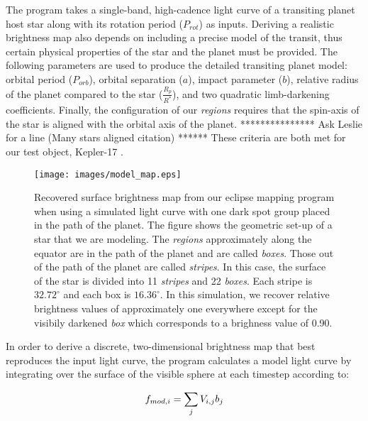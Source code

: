 The program takes a single-band, high-cadence light curve of a transiting planet host star along with its rotation period ($P_{rot}$) as inputs. Deriving a realistic brightness map also depends on including a precise model of the transit, thus certain physical properties of the star and the planet must be provided. The following parameters are used to produce the detailed transiting planet model: orbital period ($P_{orb}$), orbital separation ($a$), impact parameter ($b$), relative radius of the planet compared to the star ($\frac{R_p}{R^{*}}$), and two quadratic limb-darkening coefficients. Finally, the configuration of our {\it regions} requires that the spin-axis of the star is aligned with the orbital axis of the planet. *************** Ask Leslie for a line (Many stars aligned citation) ****** These criteria are both met for our test object, Kepler-17 \citep{Borucki2011}. %

\begin{figure}[h]
	\centering
	\texttt{[image: images/model\_map.eps]}
	\caption{Recovered surface brightness map from our eclipse mapping program when using a simulated light curve with one dark spot group placed in the path of the planet. The figure shows the geometric set-up of a star that we are modeling. The {\it regions} approximately along the equator are in the path of the planet and are called {\it boxes}. Those out of the path of the planet are called {\it stripes}. In this case, the surface of the star is divided into 11 {\it stripes} and 22 {\it boxes}. Each stripe is $32.72^{\circ}$ and each box is $16.36^{\circ}$. In this simulation, we recover relative brightness values of approximately one everywhere except for the visibily darkened {\it box} which corresponds to a brighness value of 0.90.}
	\label{bright_map}
\end{figure}

In order to derive a discrete, two-dimensional brightness map that best reproduces the input light curve, the program calculates a model light curve by integrating over the surface of the visible sphere at each timestep according to:

\begin{equation}
	\mbox{$f_{mod,i}$} = \sum_j V_{i,j}b_j
\end{equation}

